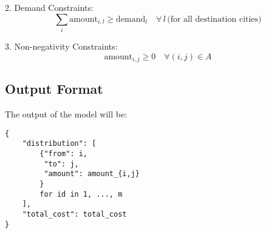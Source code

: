 \documentclass{article}
\begin{document}
2. Demand Constraints:
\[
\sum_{i} \text{amount}_{i,l} \geq \text{demand}_{l} \quad \forall \, l \, \text{(for all destination cities)}
\]

3. Non-negativity Constraints:
\[
\text{amount}_{i,j} \geq 0 \quad \forall (i,j) \in A
\]

\subsection*{Output Format}
The output of the model will be:
\begin{verbatim}
{
    "distribution": [
        {"from": i,
         "to": j,
         "amount": amount_{i,j}
        }
        for id in 1, ..., m
    ],
    "total_cost": total_cost
}
\end{verbatim}
\end{document}
